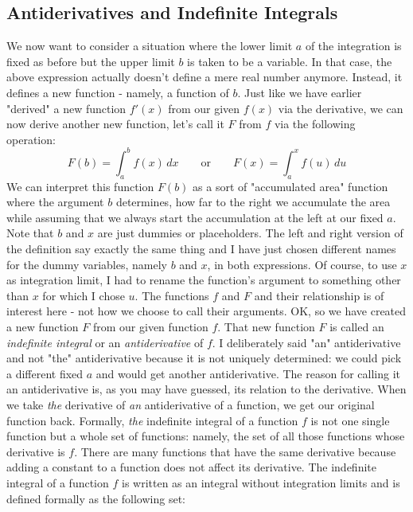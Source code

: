 



\subsection{Antiderivatives and Indefinite Integrals}
We now want to consider a situation where the lower limit $a$ of the integration is fixed as before but the upper limit $b$ is taken to be a variable. In that case, the above expression actually doesn't define a mere real number anymore. Instead, it defines a new function - namely, a function of $b$. Just like we have earlier "derived" a new function $f'(x)$ from our given $f(x)$ via the derivative, we can now derive another new function, let's call it $F$ from $f$ via the following operation:
\begin{equation}
F(b) = \int_a^b f(x) \, dx \qquad \text{or} \qquad
F(x) = \int_a^x f(u) \, du
\end{equation}
We can interpret this function $F(b)$ as a sort of "accumulated area" function where the argument $b$ determines, how far to the right we accumulate the area while assuming that we always start the accumulation at the left at our fixed $a$. Note that $b$ and $x$ are just dummies or placeholders. The left and right version of the definition say exactly the same thing and I have just chosen different names for the dummy variables, namely $b$ and $x$, in both expressions. Of course, to use $x$ as integration limit, I had to rename the function's argument to something other than $x$ for which I chose $u$. The functions $f$ and $F$ and their relationship is of interest here - not how we choose to call their arguments. OK, so we have created a new function $F$ from our given function $f$. That new function $F$ is called an \emph{indefinite integral} or an \emph{antiderivative} of $f$. I deliberately said "an" antiderivative and not "the" antiderivative because it is not uniquely determined: we could pick a different fixed $a$ and would get another antiderivative. The reason for calling it an antiderivative is, as you may have guessed, its relation to the derivative. When we take \emph{the} derivative of \emph{an} antiderivative of a function, we get our original function back. Formally, \emph{the} indefinite integral of a function $f$ is not one single function but a whole set of functions: namely, the set of all those functions whose derivative is $f$. There are many functions that have the same derivative because adding a constant to a function does not affect its derivative. The indefinite integral of a function $f$ is written as an integral without integration limits and is defined formally as the following set:
